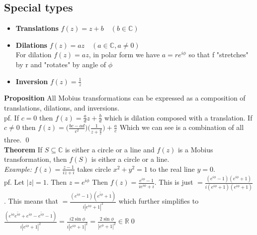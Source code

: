 \documentclass[a4paper, 11pt]{article}
\begin{document}
\subsection*{Special types}
	\begin{itemize}
		\item \textbf{Translations} $f(z) = z+b \quad (b\in\mathbb{C})$ 
		\item \textbf{Dilations} $f(z) = az \quad (a\in\mathbb{C}, a\neq 0)$ \\ 
			\noindent For dilation $f(z)=az$, in polar form we have $a=re^{i\phi}$ so that f "stretches" by r and "rotates" by angle of $\phi$
		\item \textbf{Inversion} $f(z) = \frac{1}{z}$
	\end{itemize}
	
	\noindent \textbf{Proposition} All Mobius transformations can be expressed as a composition of translations, dilations, and inversions.\\
	
	\noindent pf. If $c=0$ then $f(z) = \frac{a}{d}z + \frac{b}{d}$ which is dilation composed with a  translation. If $c\neq 0$ then $f(z) = \Big(\frac{bc-ad}{c^2}\Big)\Big(\frac{1}{z+\frac{d}{c}}\Big)+\frac{a}{c}$ Which we can see is a combination of all three. \qed\\
	
	\noindent \textbf{Theorem} If $S\subseteq \mathbb{C}$ is either a circle or a line and $f(z)$ is a Mobius transformation, then $f(S)$ is either a circle or a line. \\
	
	\noindent \textit{Example:} $f(z) = \frac{z-1}{iz+i}$ takes circle $x^2+y^2=1$ to the real line $y=0$. \\ 
	
	\noindent pf. Let $|z|=1$. Then $z=e^{i\phi}$ Then $f(z) = \frac{e^{i\phi}-1}{ie^{i\phi}+i}$. This is just $= \frac{(e^{i\phi}-1)(e^{i\phi}+1)}{i(e^{i\phi}+1)(e^{i\phi}+1)} $. This means that $=\frac{(e^{i\phi}-1)(\overline{e^{i\phi}}+1)}{i|e^{i\phi}+1|^2}$ which further simplifies to $\frac{(e^{i\phi}\overline{e^{i\phi}}+e^{i\phi}-\overline{e^{i\phi}}-1)}{i|e^{i\phi}+1|^2} = \frac{i2\sin\phi}{i|e^{i\phi}+1|^2} = \frac{2\sin\phi}{|e^{\phi}+1|^2} \in\mathbb{R}$\qed 
\end{document}
